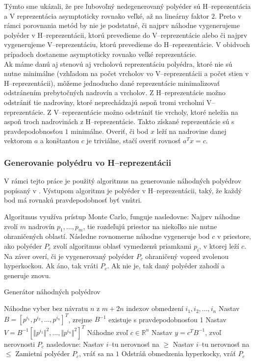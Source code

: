Týmto sme ukázali, že pre ľubovoľný nedegenerovaný polyéder sú H--reprezentácia a V reprezentácia asymptoticky rovnako veľké, až na lineárny faktor $2$.
Preto v rámci porovnania metód by nie je podstatné, či najprv náhodne vygenerujeme polyéder v H--reprezentácii, ktorú prevedieme do V--reprezentácie alebo či najprv vygenerujeme V--reprezentáciu, ktorú prevedieme do H--reprezentácie. V obidvoch prípadoch dostaneme asymptoticky rovnako veľké reprezentácie.\\


Ak máme danú aj stenovú aj vrcholovú reprezentáciu polyédra, ktoré nie sú nutne minimálne (vzhľadom na počet vrcholov vo V--reprezentácii a počet stien v H--reprezentácii), môžeme jednoducho dané reprezentácie minimalizovať odstránením prebytočných nadrovín a vrcholov. Z H--reprezentácie možno odstrániť tie nadroviny, ktoré neprechádzajú aspoň tromi vrcholmi V--reprezentácie. Z V--reprezentácie možno odstrániť tie vrcholy, ktoré neležia na aspoň troch nadrovinách z H--reprezentácie. Takto získané reprezentácie sú s pravdepodobnosťou $1$ minimálne.
Overiť, či bod $x$ leží na nadrovine danej vektorom $a$ a konštantou $c$ je triviálne, stačí overiť rovnosť $a^Tx=c$.

\subsubsection{Generovanie polyédru vo H--reprezentácii}

V rámci tejto práce je použitý algoritmus na generovanie náhodných polyédrov popísaný v \cite{random_may}. Výstupom algoritmu je polyéder v H--reprezentácii, taký, že každý bod má rovnakú pravdepodobnosť byť vnútri. 

Algoritmus využíva prístup Monte Carlo, funguje nasledovne: Najprv náhodne zvolí $m$ nadrovín $p_1, \dots, p_m$, tie rozdeľujú priestor na niekoľko nie nutne ohraničených oblastí.
Následne rovnomerne náhodne vygeneruje bod $c$ v priestore, ako polyéder $P_c$ zvolí algoritmus oblasť vymedzenú priamkami $p_i$, v ktorej leží $c$.
Na záver overí, či je vygenerovaný polyéder $P_c$ ohraničený vopred zvolenou hyperkockou. Ak áno, tak vráti $P_c$. Ak nie je, tak daný polyéder zahodí a generuje znovu.

\begin{algorithm}[H]
	\caption{Generátor náhodných polyédrov \cite{random_may}}
	\label{generator-polyedrov}
	\begin{algorithmic}[1]
		\State Náhodne vyber bez návratu $n$ z $m+2n$ indexov obmedzení $i_1, i_2, \dots, i_n$
		\State Nastav $B=[p^{i_1}, p^{i_2}, \dots, p^{i_n}]^T$, zrejme $B^{-1}$ existuje s pravdepodobnosťou 1
		\State Nastav $V=B^{-1}[\Vert p^{i_1}\Vert ^2, \dots, \Vert p^{i_n}\Vert ^2]^T$
		\State Náhodne zvoľ $c \in \mathbb{R}^n$
		\State Nastav $y=c^TB^{-1}$, zvoľ nerovnosti $P_c$ nasledovne:
				\State Nastav $i$--tu nerovnosť na $\ge$
			\Else
				\State Nastav $i$--tu nerovnosť na $\le$
			\EndIf
		\EndFor
			\State Zamietni polyéder $P_c$, vráť sa na $1$
		\Else
			\State Odstráň obmedzenia hyperkocky, vráť $P_c$
		\EndIf
	\end{algorithmic}
\end{algorithm}

